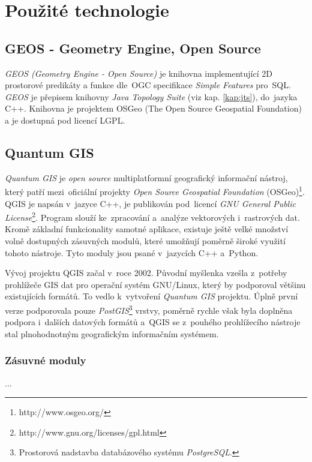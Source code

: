 \chapter{Použité technologie}
\label{4-technologie}

\section{GEOS - Geometry Engine, Open Source}
\label{geos}

\textit{GEOS (Geometry Engine - Open Source)} je knihovna implementující 2D 
prostorové predikáty a funkce dle~OGC specifikace \textit{Simple Features} 
pro~SQL. \textit{GEOS} je přepisem knihovny \textit{Java Topology Suite} 
(viz kap. \ref{kap:jts}), do~jazyka C++. Knihovna je projektem OSGeo 
(The Open Source Geospatial Foundation) a je dostupná pod licencí LGPL.

% 

\section{Quantum GIS}
\label{qgis}

\textit{Quantum GIS} je \textit{open source} multiplatformní geografický 
informační nástroj, který patří mezi~oficiální projekty \textit{Open Source 
Geospatial Foundation} (OSGeo)\footnote{http://www.osgeo.org/}. QGIS je 
napsán v~jazyce C++, je publikován pod~licencí \textit{GNU General Public 
License}\footnote{http://www.gnu.org/licenses/gpl.html}. Program slouží 
ke~zpracování a~analýze vektorových i~rastrových dat. Kromě základní 
funkcionality samotné aplikace, existuje ještě velké množství volně 
dostupných zásuvných modulů, které umožňují poměrně široké využití 
tohoto nástroje. Tyto moduly jsou psané v~jazycích C++ a~Python.

Vývoj projektu QGIS začal v~roce 2002. Původní myšlenka vzešla z~potřeby 
prohlížeče GIS dat pro operační systém GNU/Linux, který by podporoval většinu 
existujících formátů. To vedlo k~vytvoření \textit{Quantum GIS} projektu. Úplně 
první verze podporovala pouze \textit{PostGIS}\footnote{Prostorová nadstavba 
databázového systému \textit{PostgreSQL}.} vrstvy, poměrně rychle však byla 
doplněna podpora i~dalších datových formátů a~QGIS se z~pouhého prohlížecího 
nástroje stal plnohodnotným geografickým informačním systémem.


\subsection{Zásuvné moduly}
\label{qgis plugins}
...
